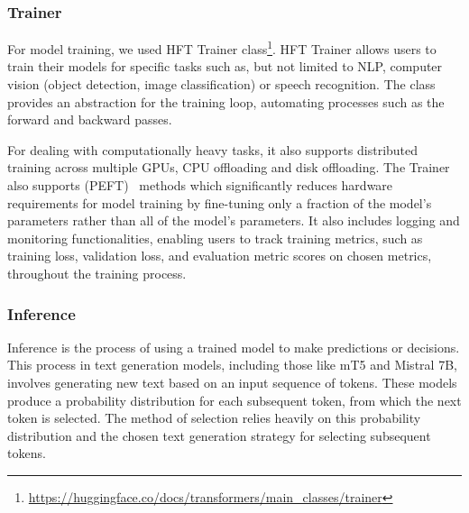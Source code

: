 \documentclass[english, ba, kiv, he, iso690numb, pdf, viewonly]{fasthesis}
\begin{document}
\subsubsection{Trainer} \label{hf:trainer}
For model training, we used HFT Trainer class\footnote{\url{https://huggingface.co/docs/transformers/main_classes/trainer}}. HFT Trainer allows users to train their models for specific tasks such as, but not limited to NLP, computer vision (object detection, image classification) or speech recognition.
The class provides an abstraction for the training loop, automating processes such as the forward and backward passes.

For dealing with computationally heavy tasks, it also supports distributed training across multiple GPUs, CPU offloading and disk offloading. The Trainer also supports  (PEFT)~\cite{peft} methods which significantly reduces hardware requirements for model training by fine-tuning only a fraction of the model's parameters rather than all of the model's parameters.
It also includes logging and monitoring functionalities, enabling users to track training metrics, such as training loss, validation loss, and evaluation metric scores on chosen metrics, throughout the training process.

\subsubsection{Inference}
Inference is the process of using a trained model to make predictions or decisions.
This process in text generation models, including those like mT5 and Mistral 7B, involves generating new text based on an input sequence of tokens. These models produce a probability distribution for each subsequent token, from which the next token is selected. The method of selection relies heavily on this probability distribution and the chosen text generation strategy for selecting subsequent tokens.
\end{document}
